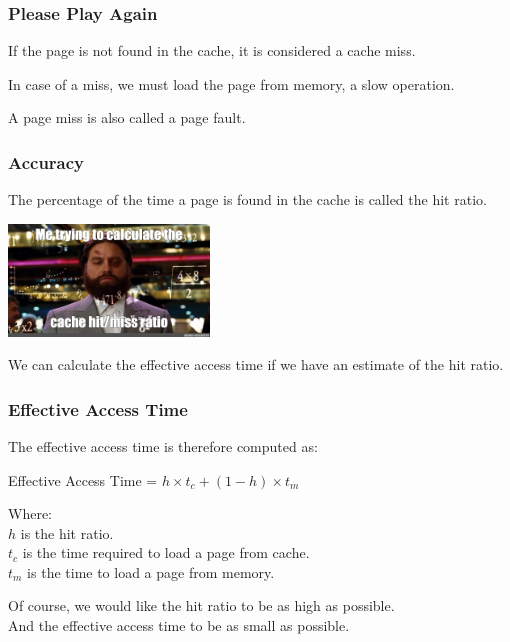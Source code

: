 \begin{frame}
\frametitle{Please Play Again}

If the page is not found in the cache, it is considered a cache \alert{miss}. 

In case of a miss, we must load the page from memory, a slow operation. 

A page miss is also called a \alert{page fault}.

\end{frame}

\begin{frame}
\frametitle{Accuracy}

The percentage of the time  a page is found in the cache is called the \alert{hit ratio}.

\begin{center}
	\includegraphics[width=0.4\textwidth]{images/hitratio.jpg}
\end{center}

We can calculate the effective access time if we have an estimate of the hit ratio.

\end{frame}

\begin{frame}
\frametitle{Effective Access Time}

The effective access time is therefore computed as:

\begin{center}
Effective Access Time = $h \times t_{c} + (1-h) \times t_{m}$
\end{center}

Where:\\
\quad $h$ is the hit ratio.\\
\quad $t_{c}$ is the time required to load a page from cache.\\
\quad $t_{m}$ is the time to load a page from memory. 


Of course, we would like the hit ratio to be as high as possible.\\
\quad And the effective access time to be as small as possible.

\end{frame}

